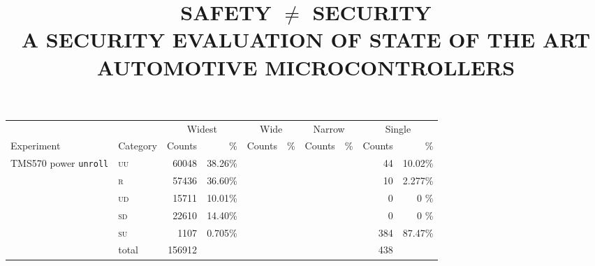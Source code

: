 \documentclass[10pt]{article}
\title{SAFETY $\neq$ SECURITY \\ A SECURITY EVALUATION OF STATE OF THE ART AUTOMOTIVE MICROCONTROLLERS}
\author{}
\date{}
\newcommand{\TI}{TMS570\xspace}
\newcommand{\unroll}{\texttt{unroll}\xspace}
\newcommand{\UU}{\textsc{uu}\xspace}
\newcommand{\UD}{\textsc{ud}\xspace}
\newcommand{\SU}{\textsc{su}\xspace}
\newcommand{\SD}{\textsc{sd}\xspace}
\newcommand{\R}{\textsc{r}\xspace}
\begin{document}
\begin{table}[H]
    \centering
    \begin{tabular}{ll rr rr rr rr}
    \toprule

      &  & \multicolumn{2}{c}{Widest }     &    
           \multicolumn{2}{c}{Wide }      &    
           \multicolumn{2}{c}{Narrow }   &
           \multicolumn{2}{c}{Single }  \\
           \cmidrule(lr){3-4}                    
           \cmidrule(lr){5-6}
           \cmidrule(lr){7-8}
           \cmidrule(l){9-10}
      Experiment & \multicolumn{1}{c}{Category}  & 
      \multicolumn{1}{c}{Counts}      & \multicolumn{1}{r}{\%}          & 
      \multicolumn{1}{c}{Counts}      & \multicolumn{1}{r}{\%}          & 
      \multicolumn{1}{c}{Counts}      & \multicolumn{1}{r}{\%}          & 
      \multicolumn{1}{c}{Counts}      & \%         \\

    \midrule

    \multicolumn{1}{c}{\multirow{3}{*}{ \parbox{2cm}{\TI power \unroll}}}

    & \UU    
    & 60048  & 38.26\%                   
    & &  
    & &     
    &  44  &  10.02\%   
    \\
    & \R   
    & 57436  & 36.60\%                   
    & &  
    & &     
    &  10  &  2.277\%   
    \\
    & \UD  
    & 15711  & 10.01\%                   
    & &  
    & &     
    &  0   &  0    \%   
    \\
    & \SD     
    & 22610  & 14.40\%                   
    & &  
    & &     
    &  0   &  0    \%   
    \\
    & \SU      
    & 1107   & 0.705\%                   
    & &  
    & &     
    &  384 &  87.47\%   
    \\

    \cmidrule(l){2-10}
    & total    
    & 156912 &                            
    & &  
    & & 
    &  438 &             
    \\       

    \midrule


\end{tabular}
\end{table}
\end{document}
